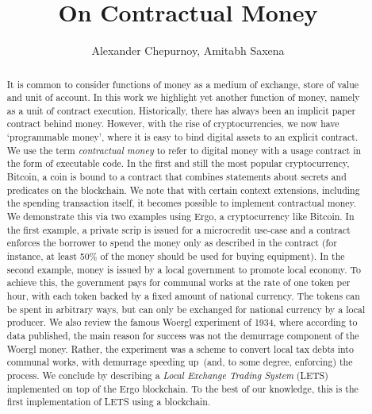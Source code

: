 \documentclass[]{llncs}   %
\begin{document}
\title{On Contractual Money}

\author{Alexander Chepurnoy, Amitabh Saxena}

\maketitle

\begin{abstract}
	
It is common to consider functions of money as a medium of exchange, store of value and unit of account. 
In this work we highlight yet another function of money, namely as a unit of contract execution. Historically, there has always been an implicit paper contract behind money. However, with the rise of cryptocurrencies, we now have `programmable money', where it is easy to bind digital assets to an explicit contract. We use the term {\em contractual money} to refer to digital money with a usage contract in the form of executable code. In the first and still the most popular cryptocurrency, Bitcoin, a coin is bound to a contract that combines
statements about secrets and predicates on the blockchain. We note that with certain context extensions, including the spending transaction itself, it becomes possible to implement contractual money. We demonstrate this via two examples using Ergo, a cryptocurrency like Bitcoin. 
In the first example, a private scrip is issued for a microcredit use-case and a contract enforces the borrower to spend the money only as described in the contract (for instance, at least 50\% of the money should be used for buying equipment). 
In the second example, money is issued by a local government to promote local economy. To achieve this, the government pays for communal works at the rate of one token per hour, with each token backed by a fixed amount of national currency. The tokens can be spent in arbitrary ways, but can only be exchanged for national currency by a local producer. 
We also review the famous Woergl experiment of 1934, where according to data published, the main reason for success was not the demurrage component of the Woergl money. Rather, the experiment was a scheme to convert local tax debts into communal works, with demurrage speeding up~(and, to some degree, enforcing) the process.
We conclude by describing a {\em Local Exchange Trading System} (LETS) implemented on top of the Ergo blockchain. To the best of our knowledge, this is the first implementation of LETS using a blockchain.
 

\end{abstract}
\end{document}
